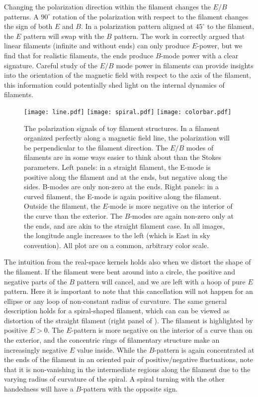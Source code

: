 Changing the polarization direction within the filament changes the $E/B$ patterns.  A $90^\circ$ rotation of the polarization with respect to the filament changes the sign of both $E$ and $B$.  In a polarization pattern aligned at $45^\circ$ to the filament, the $E$ pattern will swap with the $B$ pattern.  The work in \cite{Zaldarriaga2001a} correctly argued that linear filaments (infinite and without ends) can only produce $E$-power, but we find that for realistic filaments, the ends produce $B$-mode power with a clear signature.  Careful study of the $E/B$ mode power in filaments can provide insights into the orientation of the magnetic field with respect to the axis of the filament, this information could potentially shed light on the internal dynamics of filaments.
% 
\begin{figure}[t]
\texttt{[image: line.pdf]}
\texttt{[image: spiral.pdf]}
\texttt{[image: colorbar.pdf]}
\caption{ The polarization signals of toy filament structures. In a filament organized perfectly along a magnetic field line, the polarization will be perpendicular to the filament direction.  The $E/B$ modes of filaments are in some ways easier to think about than the Stokes parameters. Left panels: in a straight filament, the E-mode is positive along the filament and at the ends, but negative along the sides.  B-modes are only non-zero at the ends.  Right panels: in a curved filament, the E-mode is again positive along the filament.  Outside the filament, the $E$-mode is more negative on the interior of the curve than the exterior.  The $B$-modes are again non-zero only at the ends, and are akin to the straight filament case. In all images, the longitude angle increases to the left (which is East in sky convention).  All plot are on a common, arbitrary color scale.}
\label{fig:polfilaments}
\end{figure}
%
\indent The intuition from the real-space kernels holds also when we distort the shape of the filament.  If the filament were bent around into a circle, the positive and negative parts of the $B$ pattern will cancel, and we are left with a hoop of pure $E$ pattern. Here it is important to note that this cancellation will not happen for an ellipse or any loop of non-constant radius of curvature.
The same general description holds for a spiral-shaped filament, which can can be viewed as distortion of the straight filament (right panel of  ).  The filament is highlighted by positive $E>0$.  The $E$-pattern is more negative on the interior of a curve than on the exterior, and the concentric rings of filamentary structure make an increasingly negative $E$ value inside. While the $B$-pattern is again concentrated at the ends of the filament in an oriented pair of positive/negative fluctuations, note that it is non-vanishing in the intermediate regions along the filament due to the varying radius of curvature of the spiral.  A spiral turning with the other handedness will have a $B$-pattern with the opposite sign.

